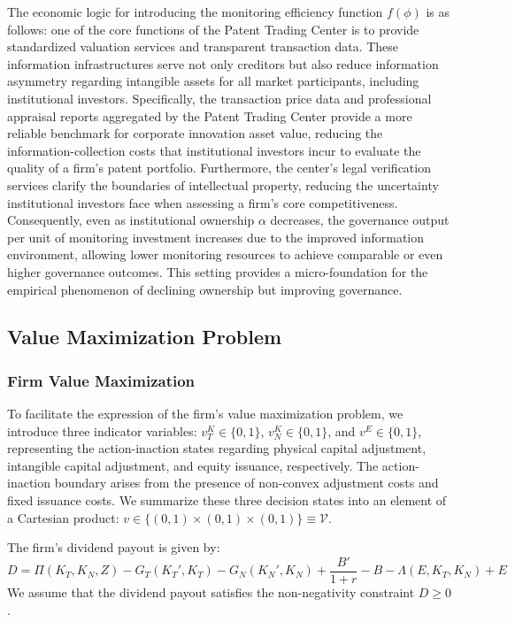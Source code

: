 \documentclass[12pt,a4paper]{article}
\begin{document}
The economic logic for introducing the monitoring efficiency function $f(\phi)$ is as follows: one of the core functions of the Patent Trading Center is to provide standardized valuation services and transparent transaction data. These information infrastructures serve not only creditors but also reduce information asymmetry regarding intangible assets for all market participants, including institutional investors. Specifically, the transaction price data and professional appraisal reports aggregated by the Patent Trading Center provide a more reliable benchmark for corporate innovation asset value, reducing the information-collection costs that institutional investors incur to evaluate the quality of a firm's patent portfolio. Furthermore, the center's legal verification services clarify the boundaries of intellectual property, reducing the uncertainty institutional investors face when assessing a firm's core competitiveness. Consequently, even as institutional ownership $\alpha$ decreases, the governance output per unit of monitoring investment increases due to the improved information environment, allowing lower monitoring resources to achieve comparable or even higher governance outcomes. This setting provides a micro-foundation for the empirical phenomenon of declining ownership but improving governance.

\subsection{Value Maximization Problem}
\subsubsection{Firm Value Maximization}
To facilitate the expression of the firm's value maximization problem, we introduce three indicator variables: $v_T^K \in \{0, 1\}$, $v_N^K \in \{0, 1\}$, and $v^E \in \{0, 1\}$, representing the action-inaction states regarding physical capital adjustment, intangible capital adjustment, and equity issuance, respectively. The action-inaction boundary arises from the presence of non-convex adjustment costs and fixed issuance costs. We summarize these three decision states into an element of a Cartesian product: $v \in \{(0,1) \times (0,1) \times (0,1)\} \equiv \mathcal{V}$.

The firm's dividend payout is given by:
\begin{equation}
D = \Pi(K_T, K_N, Z) - G_T(K_T', K_T) - G_N(K_N', K_N) + \frac{B'}{1+r} - B - \Lambda(E, K_T, K_N) + E
\end{equation}
We assume that the dividend payout satisfies the non-negativity constraint $D \ge 0$.
\end{document}
